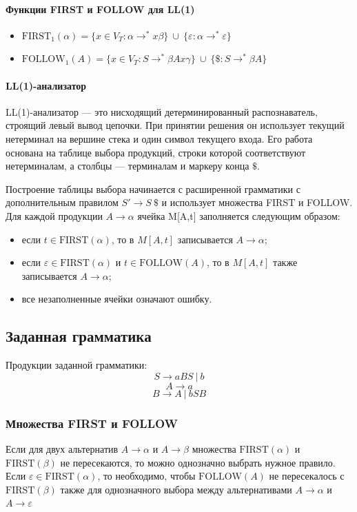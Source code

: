 \documentclass[a4paper,final]{article}
\begin{document}
\paragraph{Функции FIRST и FOLLOW для LL(1)}\mbox{}
\begin{itemize}
    \item $\text{FIRST}_1(\alpha) = \{x \in V_T : \alpha \rightarrow^* x\beta\} ~\cup~ \{\varepsilon : \alpha \rightarrow^* \varepsilon\}$
    \item $\text{FOLLOW}_1(A) = \{x \in V_T : S \rightarrow^* \beta A x \gamma\} ~\cup~ \{\$ : S \rightarrow^* \beta A\}$
\end{itemize}

\paragraph{LL(1)-анализатор}\mbox{}

LL(1)-анализатор — это нисходящий детерминированный распознаватель, строящий левый вывод цепочки. При принятии решения он использует текущий нетерминал на вершине стека и один символ текущего входа. Его работа основана на таблице выбора продукций, строки которой соответствуют нетерминалам, а столбцы — терминалам и маркеру конца $\$
$.

Построение таблицы выбора начинается с расширенной грамматики с дополнительным правилом $S' \rightarrow S~\$$ и использует множества FIRST и FOLLOW. Для каждой продукции $A \rightarrow \alpha$ ячейка M[A,t] заполняется следующим образом:
\begin{itemize}
    \item если $t \in \text{FIRST}(\alpha)$, то в $M[A, t]$ записывается $A \rightarrow \alpha$;
    \item если $\varepsilon \in \text{FIRST}(\alpha)$ и $t \in \text{FOLLOW}(A)$, то в $M[A, t]$ также записывается $A \rightarrow \alpha$;
    \item все незаполненные ячейки означают ошибку.
\end{itemize}

\subsection{Заданная грамматика}
Продукции заданной грамматики:
$$S \rightarrow aBS ~|~ b$$ $$A \rightarrow a$$ $$B \rightarrow A ~|~ bSB$$
\subsubsection{Множества FIRST и FOLLOW}
Если для двух альтернатив $A \rightarrow \alpha$ и $A \rightarrow \beta$ множества $\text{FIRST}(\alpha)$ и $\text{FIRST}(\beta)$ не пересекаются, то можно однозначно выбрать нужное правило. Если $\varepsilon \in \text{FIRST}(\alpha)$, то необходимо, чтобы $\text{FOLLOW}(A)$ не пересекалось с $\text{FIRST}(\beta)$ также для однозначного выбора между альтернативами $A \rightarrow \alpha$ и $A \rightarrow \varepsilon$
\end{document}
